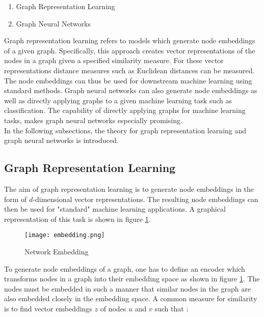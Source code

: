 	\begin{enumerate}
		\item Graph Representation Learning
		\item Graph Neural Networks
	\end{enumerate}
	
	\noindent Graph representation learning refers to models which generate node
	embeddings of a given graph. Specifically, this approach creates vector 
	representations of the nodes in a graph given a specified similarity measure. 
	For these vector representations distance measures such as Euclidean 
	distances can be measured. The node embeddings can thus be used for
	downstream machine learning using standard methods. Graph neural networks 
	can also generate node embeddings as well as directly applying graphs to a 
	given machine learning task such as classification. The capability of
	directly applying graphs for machine learning tasks, makes graph neural 
	networks especially promising. \\

	\noindent In the following subsections, the theory for graph representation 
	learning and graph neural networks is introduced. 

	\subsection{Graph Representation Learning}

	The aim of graph representation learning is to generate node embeddings in 
	the form of $d$-dimensional vector representations. The resulting node 
	embeddings can then be used for "standard" machine learning applications. 
	A graphical representation of this task is shown in figure 
	\ref{fig:embedding}.

	\begin{figure}[h]
		\centering
		\texttt{[image: embedding.png]}
		\caption{Network Embedding}
		\cite{leskovec2021lecture}
		\label{fig:embedding}
	\end{figure}

	\noindent To generate node embeddings of a graph, one has to define an
	encoder which transforms nodes in a graph into their embedding space as
	shown in figure \ref{fig:embedding}. The nodes must be embedded in such a
	manner that similar nodes in the graph are also embedded closely in the 
	embedding space. A common measure for similarity is to find vector embeddings 
	$z$ of nodes $u$ and $v$ such that \citep{leskovec2021lecture}:

